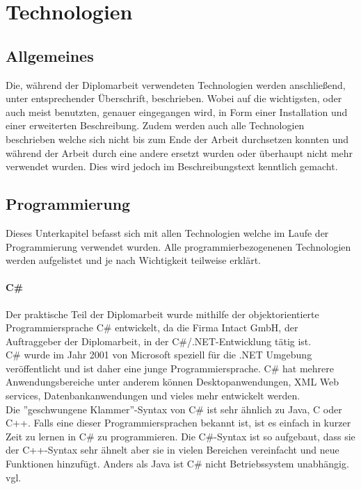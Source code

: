 \renewcommand{\theauthor}{Dario Wagner}
\chapter{Technologien}
\label{sec:Technologien}
\section{Allgemeines}
\label{sec:TechnologieAllgemeines}
Die, während der Diplomarbeit verwendeten Technologien werden anschließend, unter entsprechender Überschrift, beschrieben. Wobei auf die wichtigsten, oder auch meist benutzten, genauer eingegangen wird, in Form einer Installation und einer erweiterten Beschreibung. Zudem werden auch alle Technologien beschrieben welche sich nicht bis zum Ende der Arbeit durchsetzen konnten und während der Arbeit durch eine andere ersetzt wurden oder überhaupt nicht mehr verwendet wurden. Dies wird jedoch im Beschreibungstext kenntlich gemacht.
\section{Programmierung}
\label{sec:TechnologieProgrammierung}
Dieses Unterkapitel befasst sich mit allen Technologien welche im Laufe der Programmierung verwendet wurden. Alle programmierbezogenenen Technologien werden aufgelistet und je nach Wichtigkeit teilweise erklärt.
\subsubsection{C\#}
\label{sec:CSharp}
Der praktische Teil der Diplomarbeit wurde mithilfe der objektorientierte Programmiersprache C\# entwickelt, da die Firma Intact GmbH, der Auftraggeber der Diplomarbeit, in der C\#/.NET-Entwicklung tätig ist. \\ \break
C\# wurde im Jahr 2001 von Microsoft speziell für die .NET Umgebung veröffentlicht und ist daher eine junge Programmiersprache. C\# hat mehrere Anwendungsbereiche unter anderem können Desktopanwendungen, XML Web services, Datenbankanwendungen und vieles mehr entwickelt werden. \\ \break
Die ''geschwungene Klammer''-Syntax von C\# ist sehr ähnlich zu Java, C oder C++. Falls eine dieser Programmiersprachen bekannt ist, ist es einfach in kurzer Zeit zu lernen in C\# zu programmieren. Die C\#-Syntax ist so aufgebaut, dass sie der C++-Syntax sehr ähnelt aber sie in vielen Bereichen vereinfacht und neue Funktionen hinzufügt. Anders als Java ist C\# nicht Betriebssystem unabhängig. \\vgl. \cite{TechnologieCSharpErklaerung} 
